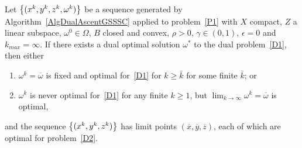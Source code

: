 \begin{proposition}\label{PropFWBCD}
Let $\left\{ (x^k,y^k,z^k,\omega^k) \right \}$ be a sequence generated by Algorithm~\ref{AlgDualAscentGSSSC} applied to problem~\eqref{P1} with $X$ compact, $Z$ a linear subspace, $\omega^0 \in \Omega$, $B$ closed and convex, $\rho > 0$, $\gamma \in (0,1)$, $\epsilon=0$ and $k_{max}=\infty$. 
If there exists a dual optimal solution $\omega^*$ to the dual problem~\eqref{D1}, then either
\begin{enumerate}
\item $\omega^k = \overline{\omega}$ is fixed and optimal for~\eqref{D1} for $k \ge \bar{k}$ for some finite $\bar{k}$; or
\item $\omega^k$ is never optimal for~\eqref{D1} for any finite $k \ge 1$, but $\lim_{k \to \infty} \omega^k = \overline{\omega}$ is optimal,
\end{enumerate}
and the sequence $\left\{ (x^k,y^k,z^k) \right \}$ has limit points $(\overline{x},\overline{y},\overline{z})$, each of which are optimal for problem~\eqref{D2}.
\end{proposition}



